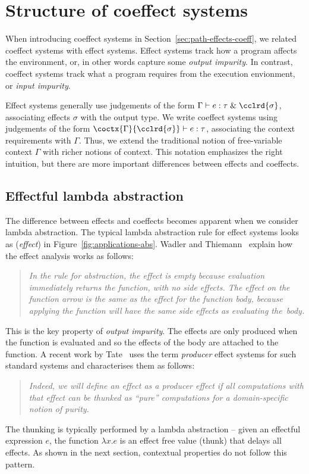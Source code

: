 \section{Structure of coeffect systems}
\label{sec:applications-structure}

When introducing coeffect systems in Section~\ref{sec:path-effects-coeff}, we related coeffect systems
with effect systems. Effect systems track how a program affects the environment, or, in other words
capture some \emph{output impurity}. In contrast, coeffect systems track what a program requires from
the execution envionment, or \emph{input impurity}.

Effect systems generally use judgements of the form $\Gamma \vdash e : \tau \;\&\; \cclrd{\sigma}$,
associating effects $\sigma$ with the output type. We write coeffect
systems using judgements of the form $\coctx{\Gamma}{\cclrd{\sigma}} \vdash e : \tau$, associating
the context requirements with $\Gamma$. Thus, we extend the traditional notion of free-variable
context $\Gamma$ with richer notions of context. This notation emphasizes the right intuition,
but there are more important differences between effects and coeffects.


\subsection{Effectful lambda abstraction}
\label{sec:applications-structure-lam}

The difference between effects and coeffects becomes apparent when we consider lambda abstraction.
The typical lambda abstraction rule for effect systems looks as (\emph{effect}) in
Figure~\ref{fig:applications-abs}. Wadler and Thiemann~\cite{monads-effects-marriage} explain how
the effect analysis works as follows:
%
\begin{quote}
\emph{In the rule for abstraction, the effect is empty because evaluation immediately
returns the function, with no side effects. The effect on the function arrow
is the same as the effect for the function body, because applying the function will
have the same side effects as evaluating the~body.}
\end{quote}
%
This is the key property of \emph{output impurity}. The effects are only produced when the
function is evaluated and so the effects of the body are attached to the function. A recent
work by Tate~\cite{effects-producer-semantics} uses the term \emph{producer} effect systems
for such standard systems and characterises them as follows:
%
\begin{quote}
\emph{Indeed, we will define an effect as a producer effect if all computations with that
effect can be thunked as ``pure'' computations for a domain-specific notion of purity.}
\end{quote}
%
The thunking is typically performed by a lambda abstraction -- given an effectful expression
$e$, the function $\lambda x.e$ is an effect free value (thunk) that delays all effects.
As shown in the next section, contextual properties do not follow this pattern.

